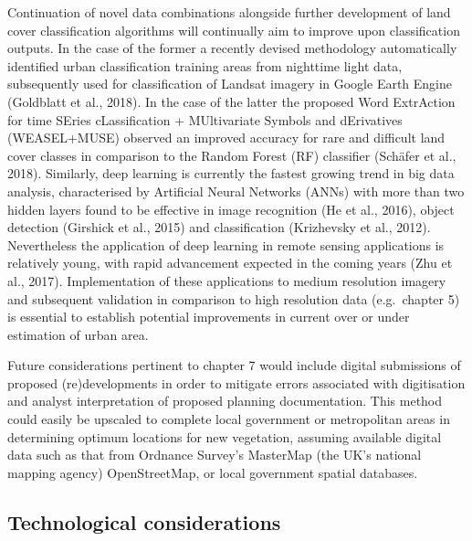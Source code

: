 \documentclass[]{book}
\begin{document}
Continuation of novel data combinations alongside further development of
land cover classification algorithms will continually aim to improve
upon classification outputs. In the case of the former a recently
devised methodology automatically identified urban classification
training areas from nighttime light data, subsequently used for
classification of Landsat imagery in Google Earth Engine (Goldblatt et
al., 2018). In the case of the latter the proposed Word ExtrAction for
time SEries cLassification + MUltivariate Symbols and dErivatives
(WEASEL+MUSE) observed an improved accuracy for rare and difficult land
cover classes in comparison to the Random Forest (RF) classifier
(Schäfer et al., 2018). Similarly, deep learning is currently the
fastest growing trend in big data analysis, characterised by Artificial
Neural Networks (ANNs) with more than two hidden layers found to be
effective in image recognition (He et al., 2016), object detection
(Girshick et al., 2015) and classification (Krizhevsky et al., 2012).
Nevertheless the application of deep learning in remote sensing
applications is relatively young, with rapid advancement expected in the
coming years (Zhu et al., 2017). Implementation of these applications to
medium resolution imagery and subsequent validation in comparison to
high resolution data (e.g.~chapter 5) is essential to establish
potential improvements in current over or under estimation of urban
area.

Future considerations pertinent to chapter 7 would include digital
submissions of proposed (re)developments in order to mitigate errors
associated with digitisation and analyst interpretation of proposed
planning documentation. This method could easily be upscaled to complete
local government or metropolitan areas in determining optimum locations
for new vegetation, assuming available digital data such as that from
Ordnance Survey's MasterMap (the UK's national mapping agency)
OpenStreetMap, or local government spatial databases.

\subsection{Technological
considerations}\label{technological-considerations}
\end{document}
